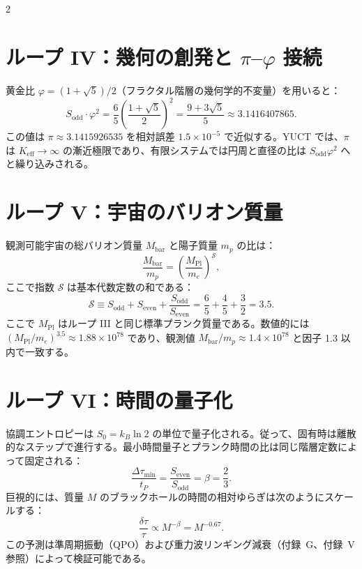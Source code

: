 \documentclass[12pt,a4paper]{article}
\newcommand{\Keff}{K_{\mathrm{eff}}}
\begin{document}
	\begin{multicols}{2}
		\section{ループ IV：幾何の創発と \(\pi\)–\(\varphi\) 接続}
		
		黄金比 \(\varphi = (1+\sqrt{5})/2\)（フラクタル階層の幾何学的不変量）を用いると：
		\begin{equation}
			S_{\mathrm{odd}} \cdot \varphi^2 = \frac{6}{5} \left( \frac{1+\sqrt{5}}{2} \right)^2 = \frac{9+3\sqrt{5}}{5} \approx 3.1416407865.
		\end{equation}
		この値は \(\pi \approx 3.1415926535\) を相対誤差 \(1.5 \times 10^{-5}\) で近似する。YUCT では、\(\pi\) は \(\Keff \to \infty\) の漸近極限であり、有限システムでは円周と直径の比は \(S_{\mathrm{odd}}\varphi^2\) へと繰り込みされる。
		
		\section{ループ V：宇宙のバリオン質量}
		
		観測可能宇宙の総バリオン質量 \(M_{\mathrm{bar}}\) と陽子質量 \(m_p\) の比は：
		\begin{equation}
			\frac{M_{\mathrm{bar}}}{m_p} = \left( \frac{M_{\mathrm{Pl}}}{m_e} \right)^{\mathcal{S}},
		\end{equation}
		ここで指数 \(\mathcal{S}\) は基本代数定数の和である：
		\begin{equation}
			\mathcal{S} \equiv S_{\mathrm{odd}} + S_{\mathrm{even}} + \frac{S_{\mathrm{odd}}}{S_{\mathrm{even}}} = \frac{6}{5} + \frac{4}{5} + \frac{3}{2} = 3.5.
		\end{equation}
		ここで \(M_{\mathrm{Pl}}\) はループ III と同じ標準プランク質量である。数値的には \((M_{\mathrm{Pl}}/m_e)^{3.5} \approx 1.88 \times 10^{78}\) であり、観測値 \(M_{\mathrm{bar}}/m_p \approx 1.4 \times 10^{78}\) と因子 1.3 以内で一致する。
		
		\section{ループ VI：時間の量子化}
		
		協調エントロピーは \(S_0 = k_B \ln 2\) の単位で量子化される。従って、固有時は離散的なステップで進行する。最小時間量子とプランク時間の比は同じ階層定数によって固定される：
		\begin{equation}
			\boxed{\frac{\Delta \tau_{\min}}{t_P} = \frac{S_{\mathrm{even}}}{S_{\mathrm{odd}}} = \beta = \frac{2}{3}}.
		\end{equation}
		巨視的には、質量 \(M\) のブラックホールの時間の相対ゆらぎは次のようにスケールする：
		\begin{equation}
			\frac{\delta \tau}{\tau} \propto M^{-\beta} = M^{-0.67}.
		\end{equation}
		この予測は準周期振動（QPO）および重力波リンギング減衰（付録~G、付録~V 参照）によって検証可能である。
		

\end{multicols}
\end{document}
